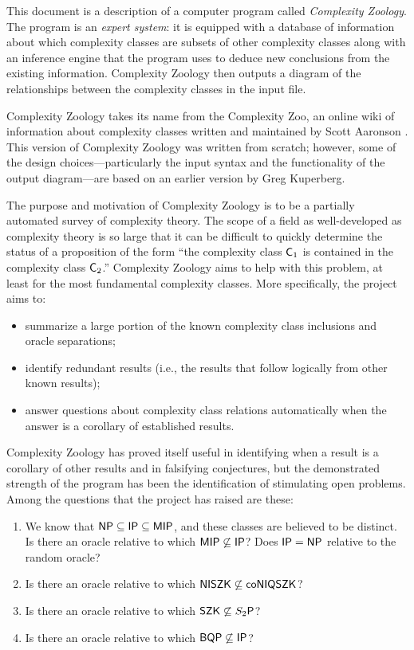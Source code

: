 This document is a description of a computer program called \textit{Complexity
Zoology}. The program is an \textit{expert system}: it is equipped with a
database of information about which complexity classes are subsets of other
complexity classes along with an inference engine that the program uses to
deduce new conclusions from the existing information. Complexity Zoology then
outputs a diagram of the relationships between the complexity classes in the
input file.

Complexity Zoology takes its name from the Complexity Zoo, an online wiki of
information about complexity classes written and maintained by Scott
Aaronson \cite{aaronsonZoo}. This version of Complexity Zoology was written from scratch; however,
some of the design choices---particularly the input syntax and the
functionality of the output diagram---are based on an earlier version by Greg
Kuperberg.

The purpose and motivation of Complexity Zoology is to be a partially automated
survey of complexity theory. The scope of a field as well-developed as
complexity theory is so large that it can be difficult to quickly determine the
status of a proposition of the form ``the complexity class $\mathsf{C}_1$ is contained
in the complexity class $\mathsf{C}_2$.'' Complexity Zoology aims to help with this
problem, at least for the most fundamental complexity classes. More
specifically, the project aims to:
\begin{itemize}
\item summarize a large portion of the known complexity class inclusions and
  oracle separations;
\item identify redundant results (i.e., the results that follow logically from
  other known results);
\item answer questions about complexity class relations automatically when the
  answer is a corollary of established results.
\end{itemize}
Complexity Zoology has proved itself useful in identifying when a result is a 
corollary of other results and in falsifying conjectures, but the demonstrated 
strength of the program has been the identification of stimulating open problems. 
Among the questions that the project has raised are these:
\begin{enumerate}
\item We know that $\mathsf{NP}\subseteq\mathsf{IP}\subseteq\mathsf{MIP}$, and these classes 
  are believed to be distinct. Is there an oracle relative to which 
  $\mathsf{MIP}\not\subseteq\mathsf{IP}$? Does $\mathsf{IP}=\mathsf{NP}$ relative to the random 
  oracle?
\item Is there an oracle relative to which 
  $\mathsf{NISZK}\not\subseteq\mathsf{co}\mathsf{NIQSZK}$?
\item Is there an oracle relative to which $\mathsf{SZK}\not\subseteq S_2\mathsf{P}$?
\item Is there an oracle relative to which $\mathsf{BQP}\not\subseteq \mathsf{IP}$?
\end{enumerate}

